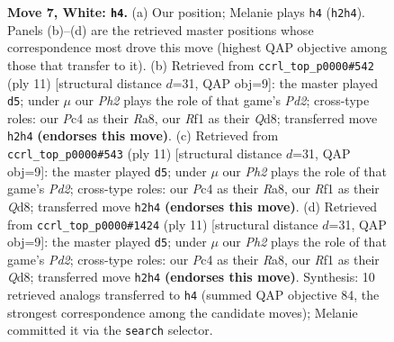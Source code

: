 \documentclass[11pt]{article}
\begin{document}
\begin{figure}[p]
\caption{\textbf{Move 7, White: \texttt{h4}.} (a) Our position; Melanie plays \texttt{h4} (\texttt{h2h4}). Panels (b)--(d) are the retrieved master positions whose correspondence most drove this move (highest QAP objective among those that transfer to it). (b) Retrieved from \texttt{ccrl\_top\_p0000\#542} (ply 11) [structural distance $d$=31, QAP obj=9]: the master played \texttt{d5}; under $\mu$ our \emph{Ph2} plays the role of that game's \emph{Pd2}; cross-type roles: our \emph{P}c4 as their \emph{R}a8, our \emph{R}f1 as their \emph{Q}d8; transferred move \texttt{h2h4} \textbf{(endorses this move)}. (c) Retrieved from \texttt{ccrl\_top\_p0000\#543} (ply 11) [structural distance $d$=31, QAP obj=9]: the master played \texttt{d5}; under $\mu$ our \emph{Ph2} plays the role of that game's \emph{Pd2}; cross-type roles: our \emph{P}c4 as their \emph{R}a8, our \emph{R}f1 as their \emph{Q}d8; transferred move \texttt{h2h4} \textbf{(endorses this move)}. (d) Retrieved from \texttt{ccrl\_top\_p0000\#1424} (ply 11) [structural distance $d$=31, QAP obj=9]: the master played \texttt{d5}; under $\mu$ our \emph{Ph2} plays the role of that game's \emph{Pd2}; cross-type roles: our \emph{P}c4 as their \emph{R}a8, our \emph{R}f1 as their \emph{Q}d8; transferred move \texttt{h2h4} \textbf{(endorses this move)}. Synthesis: 10 retrieved analogs transferred to \texttt{h4} (summed QAP objective 84, the strongest correspondence among the candidate moves); Melanie committed it via the \texttt{search} selector.}
\label{fig:thought-m12}
\end{figure}

\clearpage
\end{document}
